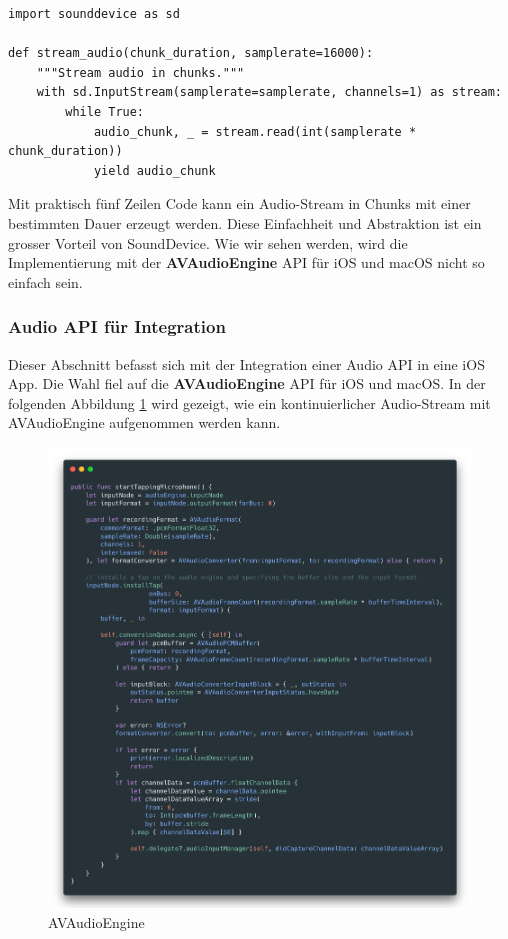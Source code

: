 \documentclass[11pt,a4paper]{article}
\begin{document}
\begin{lstlisting}[caption={SoundDevice Audio Stream}, label={lst:sounddevice}]
import sounddevice as sd

def stream_audio(chunk_duration, samplerate=16000):
    """Stream audio in chunks."""
    with sd.InputStream(samplerate=samplerate, channels=1) as stream:
        while True:
            audio_chunk, _ = stream.read(int(samplerate * chunk_duration))
            yield audio_chunk
\end{lstlisting}

\noindent
Mit praktisch fünf Zeilen Code kann ein Audio-Stream in Chunks mit einer bestimmten Dauer
erzeugt werden. Diese Einfachheit und Abstraktion ist ein grosser Vorteil von SoundDevice. Wie wir 
sehen werden, wird die Implementierung mit der \textbf{AVAudioEngine} API für iOS und macOS nicht
so einfach sein.


\newpage
\subsubsection{Audio API für Integration} \label{sec:audio_api_integration}
Dieser Abschnitt befasst sich mit der Integration einer Audio API in eine iOS App. Die Wahl 
fiel auf die \textbf{AVAudioEngine} API für iOS und macOS. In der folgenden Abbildung 
\ref{fig:avaudioengine} wird gezeigt, wie ein kontinuierlicher Audio-Stream mit AVAudioEngine 
aufgenommen werden kann.

\begin{figure}[h]
	\centering
	\includegraphics[width=1.0\linewidth]{img/avaudioengine.png}
	\caption{AVAudioEngine}
	\label{fig:avaudioengine}
\end{figure}
\end{document}

